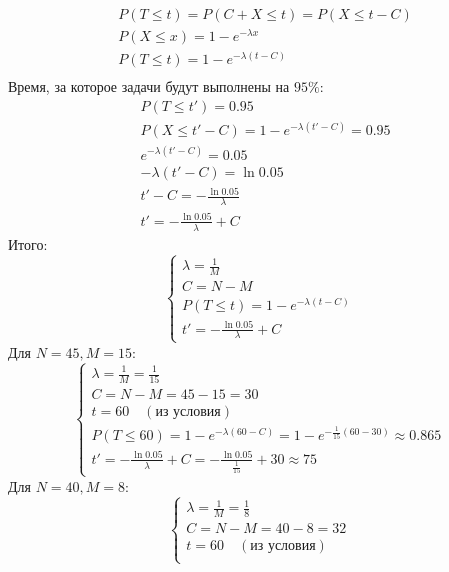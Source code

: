 \documentclass{assignment}
\begin{document}
\begin{enumerate}
\begin{align*}
        &P(T\leq t)=P(C+X \leq t)=P(X\leq t - C) \\
        &P(X\leq x)=1 - e^{-\lambda x} \\
        &P(T\leq t)=1 - e^{-\lambda (t-C)} \\
    \end{align*}
    Время, за которое задачи будут выполнены на $95\%$:
    \begin{align*}
        &P(T\leq t')=0.95 \\
        &P(X\leq t' - C) = 1 - e^{-\lambda (t'-C)} = 0.95 \\
        &e^{-\lambda (t'-C)} = 0.05 \\
        &-\lambda (t'-C) = \ln 0.05 \\
        &t'-C = -\frac{\ln 0.05}{\lambda} \\
        &t' = -\frac{\ln 0.05}{\lambda} + C
    \end{align*}
    Итого:
    \begin{equation}
        \begin{cases}
            \lambda = \frac{1}{M} \\
            C = N - M \\
            P(T\leq t)=1 - e^{-\lambda (t-C)} \\
            t' = -\frac{\ln 0.05}{\lambda} + C
        \end{cases}
    \end{equation}
    Для $N = 45, M = 15$:
    \begin{equation}
        \begin{cases}
            \lambda = \frac{1}{M} = \frac{1}{15}\\
            C = N - M = 45 - 15 = 30\\
            t = 60 \quad (\text{из условия}) \\
            P(T\leq 60)=1 - e^{-\lambda (60-C)} = 1 - e^{-\frac{1}{15} (60-30)} \approx 0.865 \\
            t' = -\frac{\ln 0.05}{\lambda} + C = -\frac{\ln 0.05}{\frac{1}{15}} + 30 \approx 75
        \end{cases}
    \end{equation}
    Для $N = 40, M = 8$:
    \begin{equation}
        \begin{cases}
            \lambda = \frac{1}{M} = \frac{1}{8}\\
            C = N - M = 40 - 8 = 32\\
            t = 60 \quad (\text{из условия}) \\

\end{cases}
\end{equation}
\end{enumerate}
\end{document}
